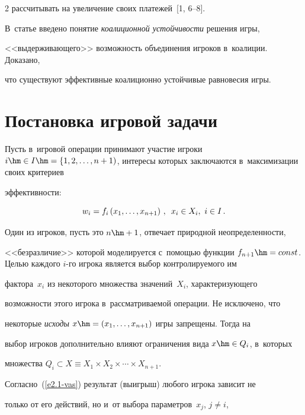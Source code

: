 \begin{multicols}{2}
рассчитывать на увеличение своих плате\-жей~[1, 6--8].

В~статье введено понятие \textit{коалиционной устойчивости} решения игры,

<<выдерживающего>> возможность объединения игроков в~коалиции. Доказано,

что существуют эффективные коалиционно устойчивые равновесия игры.



\section{Постановка игровой задачи }



    Пусть в~игровой операции принимают участие игроки $i\hm\in I\hm= \{

1,2,\ldots, n+1)$, интересы которых заключаются в~максимизации своих критериев

эффективности:

    \begin{equation}

    w_i= f_i\left( x_1,\ldots ,x_{n+1}\right)\,,\enskip x_i\in X_i,\ i\in I\,.

    \label{e2.1-vas}

    \end{equation}

Один из игроков, пусть это $n\hm+1$, отвечает природной неопределенности,

<<безразличие>> которой моделируется с~по\-мощью функции $f_{n+1}\hm=

const$. Целью каждого $i$-го игрока является выбор контролируемого им

фактора~$x_i$ из некоторого множества значений~$X_i$, характеризующего

возможности этого игрока в~рассматриваемой операции. Не исключено, что

некоторые \textit{исходы} $x\hm= (x_1,\ldots, x_{n+1})$ игры запрещены. Тогда на

выбор игроков дополнительно влияют ограничения вида $x\hm\in Q_i$, в~которых

множества $Q_i\subset X\equiv X_1\times X_2\times \cdots \times X_{n+1}$.



    Согласно~(\ref{e2.1-vas}) результат (выигрыш) любого игрока зависит не

только от его действий, но и~от выбора параметров~$x_j$, $j\not= i$,


\end{multicols}
